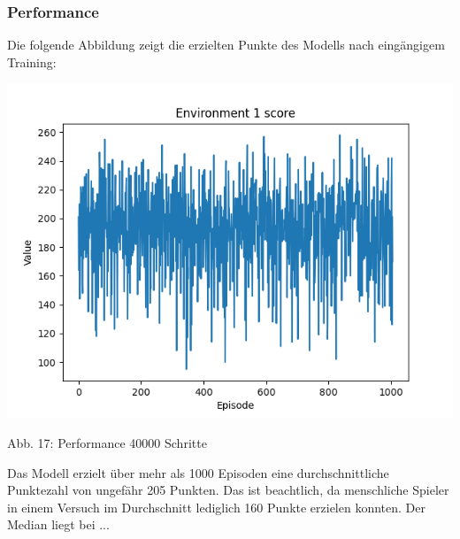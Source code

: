 \subsubsection{Performance}
\begin{minipage}{\linewidth}
	Die folgende Abbildung zeigt die erzielten Punkte des Modells nach eingängigem Training:
	
	\vspace{0.5cm}
	\includegraphics[width=1\textwidth]{Bilder/maskableppo_ganzschoenclever_193avg_v3.1}
	
	Abb. 17: Performance 40000 Schritte\\
\end{minipage}

Das Modell erzielt über mehr als 1000 Episoden eine durchschnittliche Punktezahl von ungefähr 205 Punkten. Das ist beachtlich, da menschliche Spieler in einem Versuch im Durchschnitt lediglich 160 Punkte erzielen konnten. Der Median liegt bei ...

